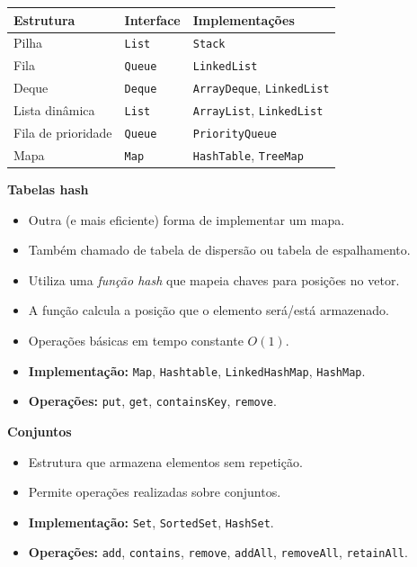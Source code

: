 \begin{table}[H]
	\centering
	\begin{tabular}{lll}
		\hline
		\textbf{Estrutura} & \textbf{Interface} & \textbf{Implementações} \\
		\hline
		Pilha & \texttt{List} & \texttt{Stack} \\
		Fila & \texttt{Queue} & \texttt{LinkedList} \\
		Deque & \texttt{Deque} & \texttt{ArrayDeque}, \texttt{LinkedList} \\
		Lista dinâmica & \texttt{List} & \texttt{ArrayList}, \texttt{LinkedList} \\
		Fila de prioridade & \texttt{Queue} & \texttt{PriorityQueue} \\
		Mapa & \texttt{Map} & \texttt{HashTable}, \texttt{TreeMap} \\
		\hline
	\end{tabular}
\end{table}

\bigskip


\textbf{Tabelas hash}
\begin{itemize}
	\item Outra (e mais eficiente) forma de implementar um mapa.
	\item Também chamado de tabela de dispersão ou tabela de espalhamento.
	\item Utiliza uma \textit{função hash} que mapeia chaves para posições no vetor.
	\item A função calcula a posição que o elemento será/está armazenado.
	\item Operações básicas em tempo constante $O(1)$.
	\item \textbf{Implementação:} \texttt{Map}, \texttt{Hashtable}, \texttt{LinkedHashMap}, \texttt{HashMap}.
	\item \textbf{Operações:} \texttt{put}, \texttt{get}, \texttt{containsKey}, \texttt{remove}.
\end{itemize}

\clearpage

\textbf{Conjuntos}
\begin{itemize}
	\item Estrutura que armazena elementos sem repetição.
	\item Permite operações realizadas sobre conjuntos.
	\item \textbf{Implementação:} \texttt{Set}, \texttt{SortedSet}, \texttt{HashSet}.
	\item \textbf{Operações:} \texttt{add}, \texttt{contains}, \texttt{remove}, \texttt{addAll}, \texttt{removeAll}, \texttt{retainAll}.
\end{itemize}

